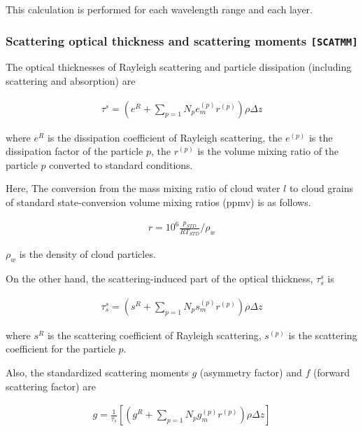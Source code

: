 This calculation is performed for each wavelength range and each layer.

\hypertarget{scattering-optical-thickness-and-scattering-moments-scatmm}{%
\subsubsection{\texorpdfstring{Scattering optical thickness and
scattering moments
\texttt{{[}SCATMM{]}}}{Scattering optical thickness and scattering moments {[}SCATMM{]}}}
\label{scattering-optical-thickness-and-scattering-moments-modulescatmm}}

The optical thicknesses of Rayleigh scattering and particle dissipation
(including scattering and absorption) are

\begin{eqnarray}
\tau^{s} 
 = \left( e^R + \sum_{p=1}{N_p} e^{(p)}_m r^{(p)}\right) \rho \Delta z
\end{eqnarray}

where \(e^R\) is the dissipation coefficient of Rayleigh scattering, the
\(e^{(p)}\) is the dissipation factor of the particle \(p\), the \(r^{(p)}\) is
the volume mixing ratio of the
particle \(p\) converted to standard conditions.

Here, The conversion from the mass mixing ratio of cloud water \(l\) to cloud 
grains of standard state-conversion volume mixing ratios (ppmv) is as follows.

\begin{eqnarray}
  r = 10^6 \frac{p_{STD}}{R T_{STD}}/\rho_w
\end{eqnarray}

\(\rho_w\) is the density of cloud particles.

On the other hand, the scattering-induced part of the optical thickness,
\(\tau_s^s\) is

\begin{eqnarray}
\tau_s^{s} 
 = \left( s^R + \sum_{p=1}{N_p} s^{(p)}_m r^{(p)}\right) \rho \Delta z
\end{eqnarray}

where \(s^R\) is the scattering coefficient of Rayleigh scattering,
\(s^{(p)}\) is the scattering coefficient for the particle \(p\).

Also, the standardized scattering moments \(g\) (asymmetry factor) and
\(f\) (forward scattering factor) are

\begin{eqnarray}
g = \frac{1}{\tau_s} \left[
    \left( g^R + \sum_{p=1}{N_p} g^{(p)}_m r^{(p)}\right) \rho \Delta z
    \right]
\end{eqnarray}

